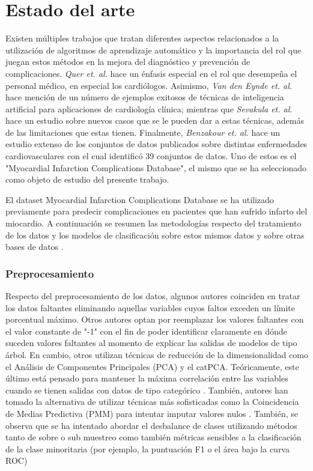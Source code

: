 \documentclass[conference]{IEEEtran}
\begin{document}
\section{\textbf{Estado del arte}}
Existen múltiples trabajos que tratan diferentes aspectos relacionados a la utilización de algoritmos de aprendizaje automático y la importancia del rol que juegan estos métodos en la mejora del diagnóstico y prevención de complicaciones. \textit{Quer et. al.} \cite{e1} hace un énfasis especial en el rol que desempeña el personal médico, en especial los cardiólogos. Asimismo, \textit{Van den Eynde et. al.} \cite{e2} hace mención de un número de ejemplos exitosos de técnicas de inteligencia artificial para aplicaciones de cardiología clínica; mientras que \textit{Sevakula et. al.} \cite{e3} hace un estudio sobre nuevos casos que se le pueden dar a estas técnicas, además de las limitaciones que estas tienen. Finalmente, \textit{Benzakour et. al.} \cite{zz} hace un estudio extenso de los conjuntos de datos publicados sobre distintas enfermedades cardiovasculares con el cual identificó 39 conjuntos de datos. Uno de estos es el "Myocardial Infarction Complications Database", el mismo que se ha seleccionado como objeto de estudio del presente trabajo.

El dataset Myocardial Infarction Complications Database se ha utilizado previamente para predecir complicaciones en pacientes que han sufrido infarto del miocardio. A continuación se resumen las metodologías respecto del tratamiento de los datos y los modelos de clasificación sobre estos mismos datos y sobre otras bases de datos \cite{bp}. 

\subsubsection{\textbf{Preprocesamiento}}
Respecto del preprocesamiento de los datos, algunos autores coinciden en tratar los datos faltantes eliminando aquellas variables cuyos faltos exceden un límite porcentual máximo. Otros autores optan por reemplazar los valores faltantes con el valor constante de "-1" con el fin de poder identificar claramente en dónde suceden valores faltantes al momento de explicar las salidas de modelos de tipo árbol\cite{bref}. En cambio, otros utilizan técnicas de reducción de la dimensionalidad\cite{bp} como el Análisis de Componentes Principales (PCA) y el catPCA. Teóricamente, este último está pensado para mantener la máxima correlación entre las variables cuando se tienen salidas con datos de tipo categórico \cite{b1}. También,  autores han tomado la alternativa de utilizar técnicas más sofisticadas como la Coincidencia de Medias Predictiva (PMM) para intentar imputar valores nulos \cite{ll}. También, se observa que se ha intentado abordar el desbalance de clases utilizando métodos tanto de sobre o sub muestreo como también métricas sensibles a la clasificación de la clase minoritaria (por ejemplo, la puntuación F1 o el área bajo la curva ROC)\cite{by}\cite{ll}
\end{document}
